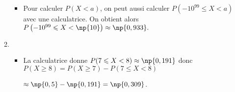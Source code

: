\documentclass{cornouaille}
\begin{document}
\begin{methode}
\begin{enumerate}
\begin{enumerate}
\begin{minipage}{0.4\linewidth}
\begin{center}
\end{center}
       \end{minipage}
\begin{itemize}\smallskip
\item Pour calculer $P(X<a)$, on peut aussi calculer $P\left(-10^{99}\leqslant X<a \right)$ avec une calculatrice. On obtient alors $P\left(-10^{99}\leqslant X< \np{10} \right)\approx\np{0,933}.$
\end{itemize}
        \item ~~




      \begin{minipage}{0.6\linewidth}
       \begin{itemize}
       \item La calculatrice donne $P(7\leqslant X<8)\approx \np{0,191}$ donc
        $P(X\geqslant 8)=P(X\geqslant 7)-P(7\leqslant X < 8)$

        $\approx \np{0,5}-\np{0,191}=\np{0,309}$.
       \end{itemize}
       \end{minipage}
        \hfill
       \begin{minipage}{0.4\linewidth}
        \begin{center}
\begin{tikzpicture}[general,xscale=0.4,yscale=4]


\end{tikzpicture}
\end{center}
\end{minipage}
\end{enumerate}
\end{enumerate}
\end{methode}
\end{document}
